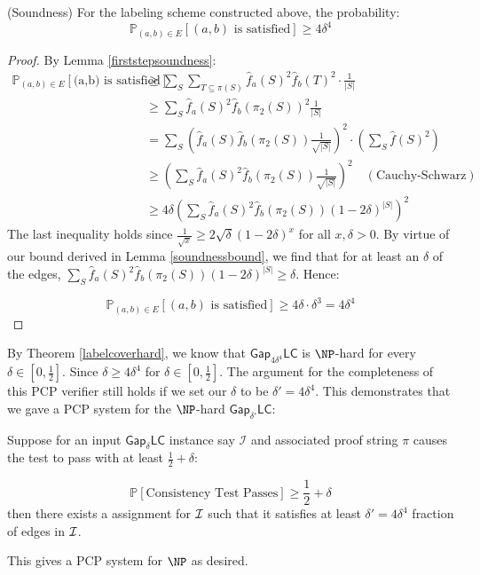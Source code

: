 \begin{proposition} (Soundness)
    For the labeling scheme constructed above, the probability:
    \begin{equation}
      \mathbb{P}_{(a,b) \in E}[ (a,b) \text{ is satisfied}] \geq 4\delta^4
    \end{equation}
\end{proposition}
%
\begin{proof}
  By Lemma \ref{firststepsoundness}:
  \begin{align*}
    \mathbb{P}_{(a,b) \in E}[ \text{(a,b) is satisfied}] & \geq \sum_{S} \sum_{T \subseteq \pi(S)} \widehat{f}_a(S)^2\widehat{f}_b(T)^2 \cdot \frac{1}{|S|} \\
    & \geq \sum_{S} \widehat{f}_a(S)^2\widehat{f}_b(\pi_2(S))^2  \frac{1}{|S|} \\
    & =  \sum_{S} \left(\widehat{f}_a(S)\widehat{f}_b(\pi_2(S))  \frac{1}{\sqrt{|S|}}\right)^2 \cdot \left(\sum_{S}\widehat{f}(S)^2 \right) \\
    & \geq \left(\sum_{S} \widehat{f}_a(S)^2\widehat{f}_b(\pi_2(S))  \frac{1}{\sqrt{|S|}} \right)^2 \quad (\text{Cauchy-Schwarz}) \\
    & \geq 4\delta\left(\sum_{S} \widehat{f}_a(S)^2\widehat{f}_b(\pi_2(S))  (1 - 2\delta)^{|S|} \right)^2
  \end{align*}
  The last inequality holds since $\frac{1}{\sqrt{x}} \geq 2\sqrt{\delta}(1-2\delta)^x$ for all $x, \delta > 0$. By virtue of our bound derived in Lemma \ref{soundnessbound}, we find that for at least an $\delta$ of the edges,
  $\sum_{S} \widehat{f}_a(S)^2\widehat{f}_b(\pi_2(S))  (1 - 2\delta)^{|S|} \geq \delta$. Hence:

  \begin{equation}
          \mathbb{P}_{(a,b) \in E}[ (a,b) \text{ is satisfied}] \geq 4\delta\cdot\delta^3 = 4\delta^4
  \end{equation}
\end{proof}

By Theorem \ref{labelcoverhard}, we know that $\mathsf{Gap}_{4\delta^4}\mathsf{LC}$ is $\NP$-hard for every $\delta \in [0,\frac{1}{2}]$. Since $\delta
\geq 4\delta^4$ for $\delta \in [0,\frac{1}{2}]$. The argument for the completeness of this PCP verifier still holds if we set our $\delta$ to be $\delta' = 4\delta^4$. This demonstrates that we gave a PCP system for the $\NP$-hard $\mathsf{Gap}_{\delta'}\mathsf{LC}$:

\begin{proposition}
  Suppose for an input $\mathsf{Gap}_{\delta}\mathsf{LC}$ instance say $\mathcal{I}$ and associated proof string $\pi$  causes the test to pass with at least $\frac{1}{2} + \delta$:

  \begin{equation}
    \mathbb{P}[\text{Consistency Test Passes}] \geq \frac{1}{2} + \delta
  \end{equation}
  then there exists a assignment for $\mathcal{I}$ such that it satisfies at least $\delta' = 4\delta^4$ fraction of edges in $\mathcal{I}$.
\end{proposition}
This gives a PCP system for $\NP$ as desired.
